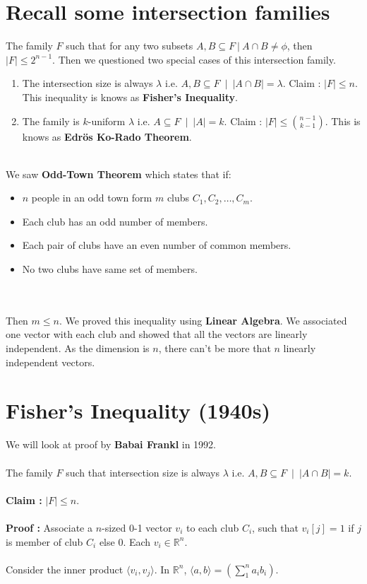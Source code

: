 \section{Recall some intersection families}
The family $F$ such that for any two subsets $A,B\subseteq F ~|~ A\cap B \neq \phi$, then $|F| \le 2^{n-1}$. Then we questioned two special cases of this intersection family.
\begin{enumerate}
    \item The intersection size is always $\lambda$ i.e. $A,B \subseteq F ~ \mid ~ |A \cap B|=\lambda$. Claim : $\boxed{|F|\le n}$. This inequality is knows as \textbf{Fisher's Inequality}.
    \item The family is $k$-uniform $\lambda$ i.e. $A \subseteq F ~ \mid ~ |A|=k$. Claim : $\boxed{|F|\le {{n-1}\choose{k-1}}}$. This is knows as \textbf{Edr{\"o}s Ko-Rado Theorem}.
\end{enumerate}\\
We saw \textbf{Odd-Town Theorem} which states that if:
\begin{itemize}
    \item $n$ people in an odd town form $m$ clubs $C_1, C_2, \hdots, C_m$.
    \item Each club has an odd number of members.
    \item Each pair of clubs have an even number of common members.
    \item No two clubs have same set of members.
\end{itemize}\\\\ Then $m\le n$. We proved this inequality using \textbf{Linear Algebra}. We associated one vector with each club and showed that all the vectors are linearly independent. As the dimension is $n$, there can't be more that $n$ linearly independent vectors.

\section{Fisher's Inequality (1940s)}
We will look at proof by \textbf{Babai Frankl} in 1992.\\\\
The family $F$ such that intersection size is always $\lambda$ i.e. $A,B \subseteq F ~ \mid ~ |A \cap B|=k $.\\\\
\textbf{Claim :} $|F|\le n$.\\\\
\textbf{Proof :} Associate a $n$-sized 0-1 vector $v_i$ to each club $C_i$, such that $v_i[j]=1$ if $j$ is member of club $C_i$ else 0. Each $v_i\in \mathbb{R}^n$.\\\\
Consider the inner product $\langle v_i,v_j\rangle$. In $\mathbb{R}^n$, $\langle a,b\rangle = (\sum_{1}^{n} a_ib_i)$.\\


